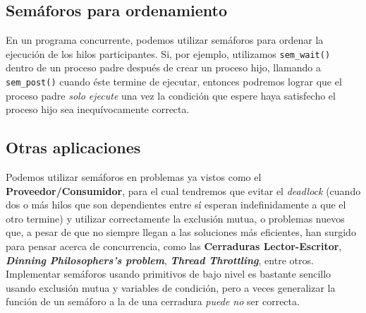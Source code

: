 \documentclass{article}
\begin{document}
	\subsection{Semáforos para ordenamiento}
	En un programa concurrente, podemos utilizar semáforos para ordenar la ejecución de los hilos participantes. Si, por ejemplo, utilizamos \lstinline|sem_wait()| dentro de un proceso padre después de crear un proceso hijo, llamando a \lstinline|sem_post()| cuando éste termine de ejecutar, entonces podremos lograr que el proceso padre \textit{solo ejecute} una vez la condición que espere haya satisfecho el proceso hijo sea inequívocamente correcta.
	
	\vspace{0.01\textheight}\noindent{}
	
	\subsection{Otras aplicaciones}
	Podemos utilizar semáforos en problemas ya vistos como el \textbf{Proveedor/Consumidor}, para el cual tendremos que evitar el \textit{deadlock} (cuando dos o más hilos que son dependientes entre sí esperan indefinidamente a que el otro termine) y utilizar correctamente la exclusión mutua, o problemas nuevos que, a pesar de que no siempre llegan a las soluciones más eficientes, han surgido para pensar acerca de concurrencia, como las \textbf{Cerraduras Lector-Escritor}, \textbf{\textit{Dinning Philosophers's problem}}, \textbf{\textit{Thread Throttling}}, entre otros. Implementar semáforos usando primitivos de bajo nivel es bastante sencillo usando exclusión mutua y variables de condición, pero a veces generalizar la función de un semáforo a la de una cerradura \textit{puede no} ser correcta.
\end{document}

